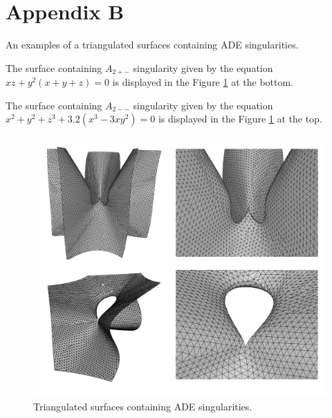\chapter*{Appendix B}
\label{appB}
An examples of a triangulated surfaces containing ADE singularities.

The surface containing $A_{2+-}$ singularity given by the equation $xz+y^2(x+y+z)=0$
is displayed in the Figure \ref{img:88} at the bottom.

The surface containing $A_{2--}$ singularity given by the equation \newline
$x^2+y^2+z^3+3.2(x^3-3xy^2)=0$
is displayed in the Figure \ref{img:88} at the top.

\begin{figure}[h!]
    \centerline{\includegraphics[scale=0.5]{images/img88}}
    \caption[Triangulated surfaces containing ADE singularities]
    {Triangulated surfaces containing ADE singularities.}
    \label{img:88}
\end{figure}

\clearpage
